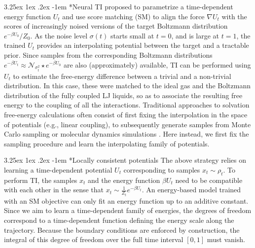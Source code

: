 \documentclass[%
onecolumn,
superscriptaddress,
nofootinbib,
amsmath,amssymb,
table
]{revtex4-2}
\makeatletter
\renewcommand\paragraph{%
  \@startsection{paragraph}{4}{\z@}%
    {3.25ex \@plus1ex \@minus.2ex}%
    {-1em}%
    {\normalfont\normalsize\bfseries}%
}
\makeatother
\begin{document}
\paragraph*{Neural TI}
\citet{mate2024neural} proposed to parametrize a time-dependent energy function $U_t$ and use score matching (SM) to align the force $\nabla U_t$ with the scores of increasingly noised versions of the target Boltzmann distribution $e^{-\beta U_0}/Z_0$. As the noise level $\sigma(t)$ starts small at $t=0$, and is large at $t=1$, the trained $U_t$ provides an interpolating potential between the target and a tractable prior. Since samples from the corresponding Boltzmann distributions $e^{-\beta U_t} \approx \mathcal N_{\sigma_t^2} \star e^{-\beta U_0}$ are also (approximately) available, TI can be performed using $U_t$ to estimate the free-energy difference between a trivial and a non-trivial distribution. In this case, these were matched to the ideal gas and the Boltzmann distribution of the fully coupled LJ liquids, so as to associate the resulting free energy to the coupling of all the interactions. 
Traditional approaches to solvation free-energy calculations often consist of first fixing the interpolation in the space of potentials (e.g., linear coupling), to subsequently generate samples from Monte Carlo sampling or molecular dynamics simulations \cite{mey2020best}. Here instead, we first fix the sampling procedure and learn the interpolating family of potentials.


\paragraph*{Locally consistent potentials}
\label{sec:local_potentials}
The above strategy relies on learning a time-dependent potential $U_t$ corresponding to samples $x_t \sim \rho_t$. To perform TI, the samples $x_t$ and the energy function $\beta U_t$ need to be compatible with each other in the sense that $x_t \sim \frac{1}{Z_t}e^{-\beta U_t}$. An energy-based model trained with an SM objective can only fit an energy function up to an additive constant. Since we aim to learn a time-dependent family of energies, the degrees of freedom correspond to a time-dependent function defining the energy scale along the trajectory. Because  the boundary conditions are enforced by construction, the integral of this degree of freedom over the full time interval $[0,1]$ must vanish.
\end{document}
